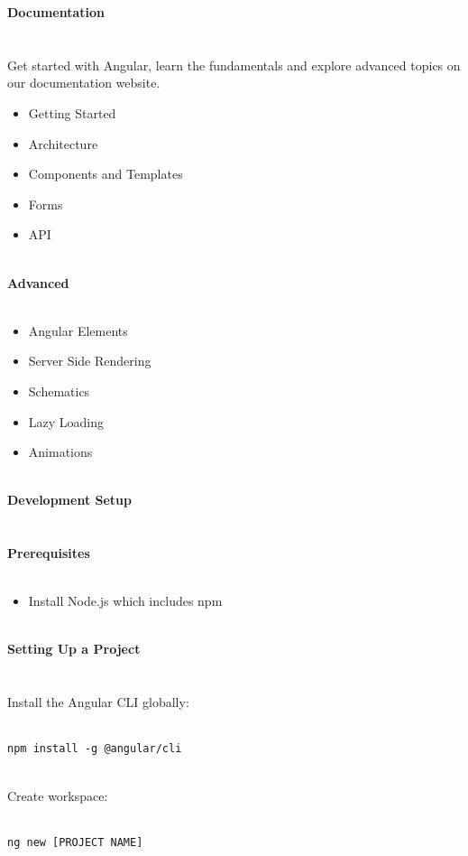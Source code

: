 \documentclass{article}
\begin{document}
{\noindent \LARGE \textbf{Documentation}}\\\\
\\
Get started with Angular, learn the fundamentals and explore advanced topics on our documentation website.\\
\begin{itemize}
	\item Getting Started
	\item Architecture
	\item Components and Templates
	\item Forms
	\item API
\end{itemize}
\\
{\noindent \Large \textbf{Advanced}}\\\\
\begin{itemize}
	\item Angular Elements
	\item Server Side Rendering
	\item Schematics
	\item Lazy Loading
	\item Animations
\end{itemize}
\\
{\noindent \LARGE \textbf{Development Setup}}\\\\
\\
{\noindent \Large \textbf{Prerequisites}}\\\\
\begin{itemize}
	\item Install Node.js which includes npm
\end{itemize}
\\
{\noindent \Large \textbf{Setting Up a Project}}\\\\
\\
Install the Angular CLI globally:\\
\\
\begin{lstlisting}
npm install -g @angular/cli
\end{lstlisting}
\\
Create workspace:\\
\\
\begin{lstlisting}
ng new [PROJECT NAME]
\end{lstlisting}
\end{document}
